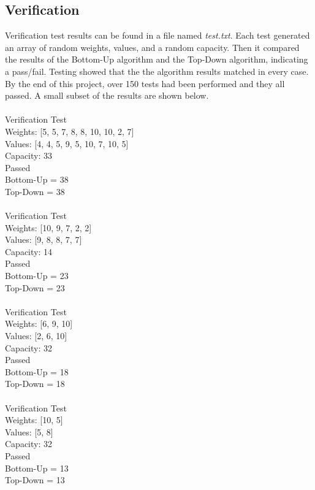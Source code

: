 \documentclass{article}
\begin{document}
\subsection{Verification}
Verification test results can be found in a file named \textit{test.txt}. Each test generated an array of random weights, values, and a random capacity. Then it compared the results of the Bottom-Up algorithm and the Top-Down algorithm, indicating a pass/fail. Testing showed that the the algorithm results matched in every case. By the end of this project, over 150 tests had been performed and they all passed. A small subset of the results are shown below. \\ \\
\ttfamily
Verification Test \\
Weights:  [5, 5, 7, 8, 8, 10, 10, 2, 7] \\
Values:  [4, 4, 5, 9, 5, 10, 7, 10, 5]\\
Capacity:  33\\
Passed\\
Bottom-Up =  38 \\
Top-Down =  38 \\
 \\
Verification Test \\
Weights:  [10, 9, 7, 2, 2] \\
Values:  [9, 8, 8, 7, 7] \\
Capacity:  14 \\
Passed \\
Bottom-Up =  23 \\
Top-Down =  23 \\
\\
Verification Test \\
Weights:  [6, 9, 10] \\
Values:  [2, 6, 10] \\
Capacity:  32 \\
Passed \\
Bottom-Up =  18 \\
Top-Down =  18 \\
 \\
Verification Test \\
Weights:  [10, 5] \\
Values:  [5, 8] \\
Capacity:  32 \\
Passed \\
Bottom-Up =  13 \\
Top-Down =  13 \\
\\
\end{document}

